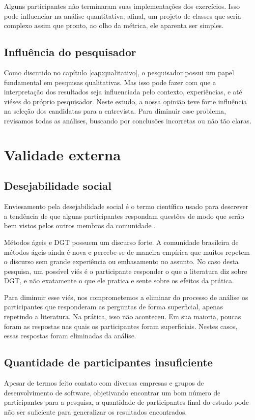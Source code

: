 Alguns participantes não terminaram suas implementações dos exercícios. Isso
pode influenciar na análise quantitativa, afinal, um projeto de classes que
seria complexo assim que pronto, ao olho da métrica, ele aparenta ser simples.

\subsection{Influência do pesquisador}

Como discutido no capítulo \ref{cap:qualitativo}, o pesquisador possui
um papel fundamental em pesquisas qualitativas. Mas isso pode fazer com que
a interpretação dos resultados seja influenciada pelo contexto, experiências,
e até viéses do próprio pesquisador.
Neste estudo, a nossa opinião teve forte influência na seleção dos candidatas
para a entrevista.
Para diminuir esse problema, revisamos todas as análises,
buscando por conclusões incorretas ou não tão claras. 

\section{Validade externa}

\subsection{Desejabilidade social}

Enviesamento pela desejabilidade social é o termo científico usado para descrever
a tendência de que alguns participantes respondam questões de modo que serão
bem vistos pelos outros membros da comunidade \cite{crowne}.

Métodos ágeis e DGT possuem um discurso forte. A comunidade brasileira de métodos
ágeis ainda é nova e percebe-se de maneira empírica que muitos repetem o discurso
sem grande experiência ou embasamento no assunto.
No caso desta pesquisa, um possível viés é o participante responder o que
a literatura diz sobre DGT, e não exatamente o que ele pratica e sente sobre
os efeitos da prática. 

Para diminuir esse viés, nos comprometemos a eliminar do processo de análise os participantes
que responderam as perguntas de forma superficial, apenas repetindo a literatura. Na prática,
isso não aconteceu. Em sua maioria, poucas foram as respostas nas quais os participantes
foram superficiais. Nestes casos, essas respostas foram eliminadas da análise.

\subsection{Quantidade de participantes insuficiente}

Apesar de termos feito contato
com diversas empresas e grupos de desenvolvimento de software,
objetivando encontrar um bom número de participantes para a pesquisa,
a quantidade de participantes final do estudo pode não ser suficiente para generalizar
os resultados encontrados. 
